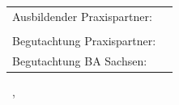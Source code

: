 \begin{titlepage}
\begin{spacing}{1}
		\vfill
		\vfill

		\begin{center}
			\begin{tabular}{ll}
				Ausbildender Praxispartner: & \myCompany        \\
				                            & \myCompanyAddress \\
				Begutachtung Praxispartner: & \myExpert         \\
				Begutachtung BA Sachsen:    & \myProf
			\end{tabular}
		\end{center}
	\end{spacing}
\end{titlepage}
\restoregeometry
\thispagestyle{empty}

\hfill

\vfill


\vfill

\noindent\footnotesize\textcopyright\ \mySubmissionDate, \myName
\endgroup
